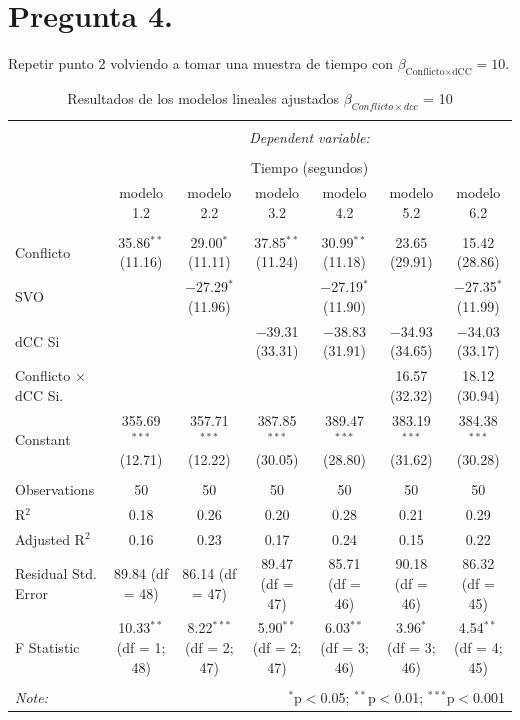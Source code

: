 \documentclass[
  spanish,
  10pt,
]{article}
\begin{document}
\newpage

\section{Pregunta 4.}\label{pregunta-4.}

Repetir punto 2 volviendo a tomar una muestra de tiempo con
\(\beta_{\text{Conflicto} \times \text{dCC}} = 10\).

\begin{table}[H] \centering 
  \caption{Resultados de los modelos lineales ajustados $\beta_{Conflicto \times dcc}$ = 10} 
  \label{} 
\scriptsize 
\begin{tabular}{@{\extracolsep{5pt}}lcccccc} 
\\[-1.8ex]\hline 
\hline \\[-1.8ex] 
 & \multicolumn{6}{c}{\textit{Dependent variable:}} \\ 
\cline{2-7} 
\\[-1.8ex] & \multicolumn{6}{c}{Tiempo (segundos)} \\ 
 & modelo 1.2 & modelo 2.2 & modelo 3.2 & modelo 4.2 & modelo 5.2 & modelo 6.2 \\ 
\hline \\[-1.8ex] 
 Conflicto & 35.86$^{**}$ (11.16) & 29.00$^{*}$ (11.11) & 37.85$^{**}$ (11.24) & 30.99$^{**}$ (11.18) & 23.65 (29.91) & 15.42 (28.86) \\ 
  SVO &  & $-$27.29$^{*}$ (11.96) &  & $-$27.19$^{*}$ (11.90) &  & $-$27.35$^{*}$ (11.99) \\ 
  dCC Si &  &  & $-$39.31 (33.31) & $-$38.83 (31.91) & $-$34.93 (34.65) & $-$34.03 (33.17) \\ 
  Conflicto $\times$ dCC Si. &  &  &  &  & 16.57 (32.32) & 18.12 (30.94) \\ 
  Constant & 355.69$^{***}$ (12.71) & 357.71$^{***}$ (12.22) & 387.85$^{***}$ (30.05) & 389.47$^{***}$ (28.80) & 383.19$^{***}$ (31.62) & 384.38$^{***}$ (30.28) \\ 
 \hline \\[-1.8ex] 
Observations & 50 & 50 & 50 & 50 & 50 & 50 \\ 
R$^{2}$ & 0.18 & 0.26 & 0.20 & 0.28 & 0.21 & 0.29 \\ 
Adjusted R$^{2}$ & 0.16 & 0.23 & 0.17 & 0.24 & 0.15 & 0.22 \\ 
Residual Std. Error & 89.84 (df = 48) & 86.14 (df = 47) & 89.47 (df = 47) & 85.71 (df = 46) & 90.18 (df = 46) & 86.32 (df = 45) \\ 
F Statistic & 10.33$^{**}$ (df = 1; 48) & 8.22$^{***}$ (df = 2; 47) & 5.90$^{**}$ (df = 2; 47) & 6.03$^{**}$ (df = 3; 46) & 3.96$^{*}$ (df = 3; 46) & 4.54$^{**}$ (df = 4; 45) \\ 
\hline 
\hline \\[-1.8ex] 
\textit{Note:}  & \multicolumn{6}{r}{$^{*}$p$<$0.05; $^{**}$p$<$0.01; $^{***}$p$<$0.001} \\ 
\end{tabular} 
\end{table}
\end{document}
